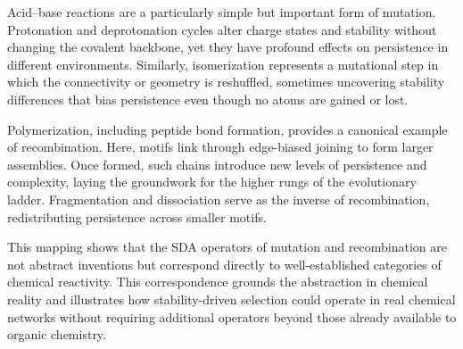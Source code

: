 \documentclass[life,article,submit,pdftex,moreauthors]{Definitions/mdpi}
\begin{document}
Acid--base reactions are a particularly simple but important form of mutation. Protonation and deprotonation cycles alter charge states and stability without changing the covalent backbone, yet they have profound effects on persistence in different environments. Similarly, isomerization represents a mutational step in which the connectivity or geometry is reshuffled, sometimes uncovering stability differences that bias persistence even though no atoms are gained or lost.  

Polymerization, including peptide bond formation, provides a canonical example of recombination. Here, motifs link through edge-biased joining to form larger assemblies. Once formed, such chains introduce new levels of persistence and complexity, laying the groundwork for the higher rungs of the evolutionary ladder. Fragmentation and dissociation serve as the inverse of recombination, redistributing persistence across smaller motifs.  

This mapping shows that the SDA operators of mutation and recombination are not abstract inventions but correspond directly to well-established categories of chemical reactivity. This correspondence grounds the abstraction in chemical reality and illustrates how stability-driven selection could operate in real chemical networks without requiring additional operators beyond those already available to organic chemistry.
\end{document}
